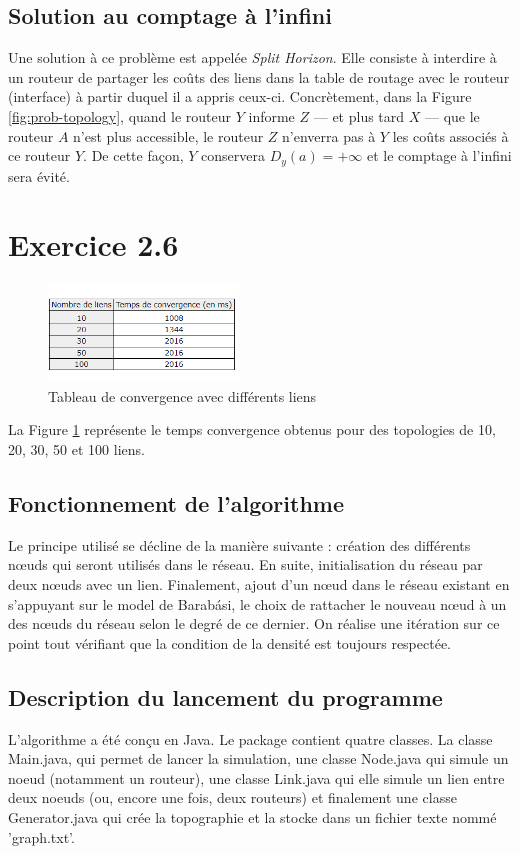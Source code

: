 \documentclass[11pt]{article}
\begin{document}
\subsection{Solution au comptage à l'infini}
Une solution à ce problème est appelée \textit{Split Horizon}. Elle consiste à interdire à un routeur de partager les coûts des liens dans la table de routage avec le routeur (interface) à partir duquel il a appris ceux-ci. Concrètement, dans la Figure \ref{fig:prob-topology}, quand le routeur $Y$ informe $Z$ --- et plus tard $X$ --- que le routeur $A$ n'est plus accessible, le routeur $Z$ n'enverra pas à $Y$ les coûts associés à ce routeur $Y$. De cette façon, $Y$ conservera $D_{y}(a)=+\infty$ et le comptage à l'infini sera évité.



\section{Exercice 2.6}
\begin{figure} [h!]
\centering
  \includegraphics[width=0.45\textwidth]{../documents/convergence-graphs.png}
  \caption{Tableau de convergence avec différents liens}
   \label{fig:graphs}
\end{figure}
La Figure \ref{fig:graphs} représente le temps convergence obtenus pour des topologies de 10, 20, 30, 50 et 100 liens.
\vspace{10px}

\subsection{Fonctionnement de l'algorithme}
Le principe utilisé se décline de la manière suivante : création des différents nœuds qui seront utilisés dans le réseau. En suite, initialisation du réseau par deux nœuds avec un lien. Finalement, ajout d’un nœud dans le réseau existant en s’appuyant sur le model de Barabási, le choix de rattacher le nouveau nœud à un des nœuds du réseau selon le degré de ce dernier. On réalise une itération sur ce point tout vérifiant que la condition de la densité est toujours respectée.\\

\subsection{Description du lancement du programme}
L'algorithme a été conçu en Java. Le package contient quatre classes. La classe Main.java, qui permet de lancer la simulation, une classe Node.java qui simule un noeud (notamment un routeur), une classe Link.java qui elle simule un lien entre deux noeuds (ou, encore une fois, deux routeurs) et finalement une classe Generator.java qui crée la topographie et la stocke dans un fichier texte nommé 'graph.txt'. 

\vspace*{\fill}
\end{document}
